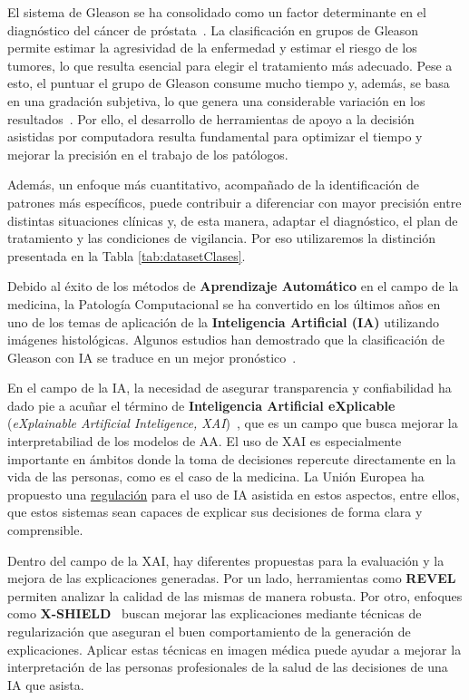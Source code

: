 El sistema de Gleason se ha consolidado como un factor determinante en el diagnóstico del cáncer de próstata~\cite{Rabaan2022}. La clasificación en grupos de Gleason permite estimar la agresividad de la enfermedad y estimar el riesgo de los tumores, lo que resulta esencial para elegir el tratamiento más adecuado. Pese a esto, el puntuar el grupo de Gleason consume mucho tiempo y, además, se basa en una gradación subjetiva, lo que genera una considerable variación en los resultados~\cite{Ikromjanov2021MultiClass}. Por ello, el desarrollo de herramientas de apoyo a la decisión asistidas por computadora resulta fundamental para optimizar el tiempo y mejorar la precisión en el trabajo de los patólogos. 

Además, un enfoque más cuantitativo, acompañado de la identificación de patrones más específicos, puede contribuir a diferenciar con mayor precisión entre distintas situaciones clínicas y, de esta manera, adaptar el diagnóstico, el plan de tratamiento y las condiciones de vigilancia. Por eso utilizaremos la distinción presentada en la Tabla \ref{tab:datasetClases}.
 
 
Debido al éxito de los métodos de \textbf{Aprendizaje Automático} en el campo de la medicina, la Patología Computacional se ha convertido en los últimos años en uno de los temas de aplicación de la \textbf{Inteligencia Artificial (IA)} utilizando imágenes histológicas. Algunos estudios han demostrado que la clasificación de Gleason con IA se traduce en un mejor pronóstico~\cite{Wulczyn2021AIProstate}. 

En el campo de la IA, la necesidad de asegurar transparencia y confiabilidad ha dado pie a acuñar el término de \textbf{Inteligencia Artificial eXplicable} (\textit{eXplainable Artificial Inteligence, XAI})~\cite{XAIManifesto}, que es un campo que busca mejorar la interpretabiliad de los modelos de AA. El uso de XAI es especialmente importante en ámbitos donde la toma de decisiones repercute directamente en la vida de las personas, como es el caso de la medicina. La Unión Europea ha propuesto una \href{https://eur-lex.europa.eu/eli/reg/2024/1689/oj}{regulación} para el uso de IA asistida en estos aspectos, entre ellos, que estos sistemas sean capaces de explicar sus decisiones de forma clara y comprensible.

Dentro del campo de la XAI, hay diferentes propuestas para la evaluación y la mejora de las explicaciones generadas. Por un lado, herramientas como \textbf{REVEL}~\cite{REVEL} permiten analizar la calidad de las mismas de manera robusta. Por otro, enfoques como \textbf{X-SHIELD}~\cite{XSHIELD} buscan mejorar las explicaciones mediante técnicas de regularización que aseguran el buen comportamiento de la generación de explicaciones. Aplicar estas técnicas en imagen médica puede ayudar a mejorar la interpretación de las personas profesionales de la salud de las decisiones de una IA que asista.

